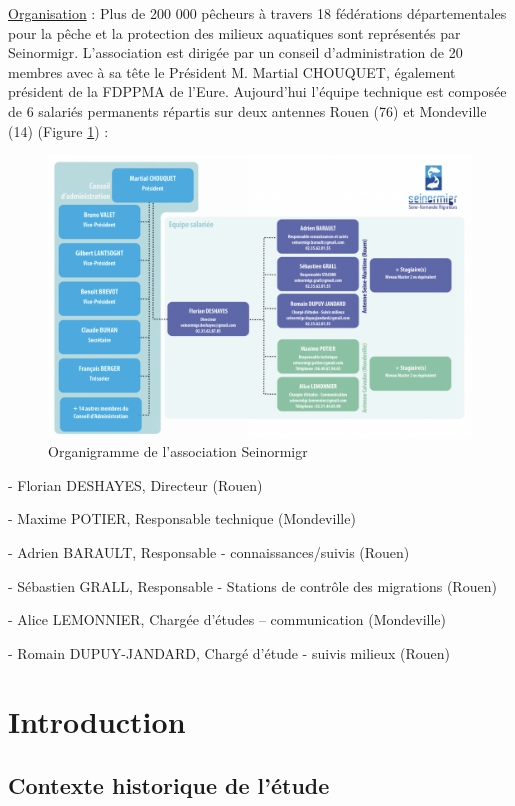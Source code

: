 \documentclass[11pt,titlepage,twoside]{article}\usepackage[]{graphicx}\usepackage[table]{xcolor}
\begin{document}
\underline{Organisation} : Plus de 200 000 pêcheurs à travers 18 fédérations départementales pour la pêche et la protection des milieux aquatiques sont représentés par Seinormigr. 
L’association est dirigée par un conseil d’administration de 20 membres avec à sa tête le Président M. Martial CHOUQUET, également président de la FDPPMA de l’Eure. Aujourd’hui l’équipe technique est composée de 6 salariés permanents répartis sur deux antennes Rouen (76) et Mondeville (14) (Figure \ref{Organigramme_Seinormigr}) :

\begin{figure}[htpb]
\centering
\includegraphics[width=\textwidth]{Organigramme_Seinormigr.png}
\caption{Organigramme de l'association Seinormigr}
\label{Organigramme_Seinormigr}
\end{figure}

-	Florian DESHAYES, Directeur (Rouen)

-	Maxime POTIER, Responsable technique (Mondeville)

-	Adrien BARAULT, Responsable - connaissances/suivis (Rouen)

-	Sébastien GRALL, Responsable - Stations de contrôle des migrations (Rouen)

-	Alice LEMONNIER, Chargée d'études – communication (Mondeville)

-	Romain DUPUY-JANDARD, Chargé d'étude - suivis milieux (Rouen)

\section{Introduction}

\subsection{Contexte historique de l’étude}
\end{document}
